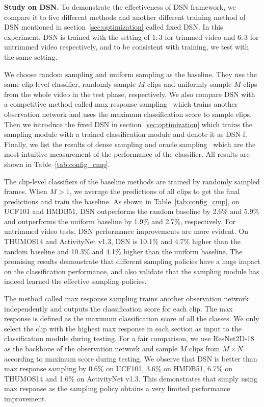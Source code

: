 \documentclass[journal]{IEEEtran}
\begin{document}
\textbf{Study on DSN.}
To demonstrate the effectiveness of DSN framework, we compare it to five different methods and another different training method of DSN mentioned in section~\ref{sec:optimization} called fixed DSN.
In this experiment, DSN is trained with the setting of $1:3$ for trimmed video and $6:3$ for untrimmed video respectively, and to be consistent with training, we test with the same setting.

We choose random sampling and uniform sampling as the baseline.
They use the same clip-level classifier, randomly sample $M$ clips and uniformly sample $M$ clips from the whole video in the test phase, respectively.
We also compare DSN with a competitive method called max response sampling~\cite{HuangRMTPFN18} which trains another observation network and uses the maximum classification score to sample clips.
Then we introduce the fixed DSN in section~\ref{sec:optimization} which trains the sampling module with a trained classification module and denote it as DSN-f.
Finally, we list the results of dense sampling and oracle sampling~\cite{HuangRMTPFN18} which are the most intuitive measurement of the performance of the classifier.
All results are shown in Table~\ref{tab:config_cmp}.

The clip-level classifiers of the baseline methods are trained by randomly sampled frames.
When $M>1$, we average the predictions of all clips to get the final predictions and train the baseline.
As shown in Table~\ref{tab:config_cmp}, on UCF101 and HMDB51, DSN outperforms the random baseline  by 2.6\%  and 5.9\% and outperforms the uniform baseline by 1.9\% and 2.7\%, respectively.
For untrimmed video tests, DSN performance improvements are more evident.
On THUMOS14 and ActivityNet v1.3, DSN is 10.1\% and 4.7\% higher than the random baseline and 10.3\% and 4.1\% higher than the uniform baseline.
The promising results demonstrate that different sampling policies have a huge impact on the classification performance, and also validate that the sampling module has indeed learned the effective sampling policies.

The method called max response sampling trains another observation network independently and outputs the classification score for each clip.
The max response is defined as the maximum classification score of all the classes.
We only select the clip with the highest max response in each section as input to the classification module during testing.
For a fair comparison, we use ResNet2D-18 as the backbone of the observation network and sample $M$ clips from $M \times N$ according to maximum score during testing.
We observe that DSN is better than max response sampling by 0.6\% on UCF101, 3.6\% on HMDB51, 6.7\% on THUMOS14 and 1.6\% on ActivityNet v1.3.
This demonstrates that simply using max response as the sampling policy obtains a very limited performance improvement.
\end{document}
